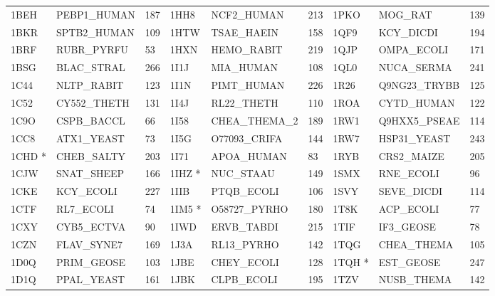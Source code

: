 \documentclass{bioinfo}
\begin{document}
\begin{table*}[!t]
{\begin{tabular}{lllllllll}
    1BEH   & PEBP1\_HUMAN & 187             & 1HH8   & NCF2\_HUMAN  & 213             & 1PKO   & MOG\_RAT     & 139             \\
    1BKR   & SPTB2\_HUMAN & 109             & 1HTW   & TSAE\_HAEIN  & 158             & 1QF9   & KCY\_DICDI   & 194             \\
    1BRF   & RUBR\_PYRFU  & 53              & 1HXN   & HEMO\_RABIT  & 219             & 1QJP   & OMPA\_ECOLI  & 171             \\
    1BSG   & BLAC\_STRAL  & 266             & 1I1J   & MIA\_HUMAN   & 108             & 1QL0   & NUCA\_SERMA  & 241             \\
    1C44   & NLTP\_RABIT  & 123             & 1I1N   & PIMT\_HUMAN  & 226             & 1R26   & Q9NG23\_TRYBB & 125             \\
    1C52   & CY552\_THETH & 131             & 1I4J   & RL22\_THETH  & 110             & 1ROA   & CYTD\_HUMAN  & 122             \\
    1C9O   & CSPB\_BACCL  & 66              & 1I58   & CHEA\_THEMA\_2 & 189             & 1RW1   & Q9HXX5\_PSEAE & 114             \\
    1CC8   & ATX1\_YEAST  & 73              & 1I5G   & O77093\_CRIFA & 144             & 1RW7   & HSP31\_YEAST & 243             \\
    1CHD *  & CHEB\_SALTY  & 203             & 1I71   & APOA\_HUMAN  & 83              & 1RYB   & CRS2\_MAIZE  & 205             \\
    1CJW   & SNAT\_SHEEP  & 166             & 1IHZ *  & NUC\_STAAU   & 149             & 1SMX   & RNE\_ECOLI   & 96              \\
    1CKE   & KCY\_ECOLI   & 227             & 1IIB   & PTQB\_ECOLI  & 106             & 1SVY   & SEVE\_DICDI  & 114             \\
    1CTF   & RL7\_ECOLI   & 74              & 1IM5 *  & O58727\_PYRHO & 180             & 1T8K   & ACP\_ECOLI   & 77              \\
    1CXY   & CYB5\_ECTVA  & 90              & 1IWD   & ERVB\_TABDI  & 215             & 1TIF   & IF3\_GEOSE   & 78              \\
    1CZN   & FLAV\_SYNE7  & 169             & 1J3A   & RL13\_PYRHO  & 142             & 1TQG   & CHEA\_THEMA  & 105             \\
    1D0Q   & PRIM\_GEOSE  & 103             & 1JBE   & CHEY\_ECOLI  & 128             & 1TQH *  & EST\_GEOSE   & 247             \\
    1D1Q   & PPAL\_YEAST  & 161             & 1JBK   & CLPB\_ECOLI  & 195             & 1TZV   & NUSB\_THEMA  & 142             \\

\end{tabular}}
\end{table*}
\end{document}
